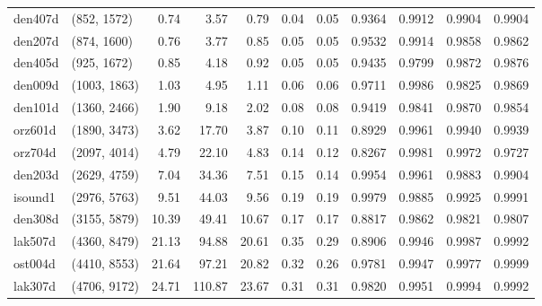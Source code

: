\begin{tabular}{llrrrrrrrrr}
 den407d &  (852, 1572) &  0.74 &   3.57 &  0.79 &  0.04 &   0.05 &   0.9364 &   0.9912 &     0.9904 &      0.9904 \\
 den207d &  (874, 1600) &  0.76 &   3.77 &  0.85 &  0.05 &   0.05 &   0.9532 &   0.9914 &     0.9858 &      0.9862 \\
 den405d &  (925, 1672) &  0.85 &   4.18 &  0.92 &  0.05 &   0.05 &   0.9435 &   0.9799 &     0.9872 &      0.9876 \\
 den009d & (1003, 1863) &  1.03 &   4.95 &  1.11 &  0.06 &   0.06 &   0.9711 &   0.9986 &     0.9825 &      0.9869 \\
 den101d & (1360, 2466) &  1.90 &   9.18 &  2.02 &  0.08 &   0.08 &   0.9419 &   0.9841 &     0.9870 &      0.9854 \\
 orz601d & (1890, 3473) &  3.62 &  17.70 &  3.87 &  0.10 &   0.11 &   0.8929 &   0.9961 &     0.9940 &      0.9939 \\
 orz704d & (2097, 4014) &  4.79 &  22.10 &  4.83 &  0.14 &   0.12 &   0.8267 &   0.9981 &     0.9972 &      0.9727 \\
 den203d & (2629, 4759) &  7.04 &  34.36 &  7.51 &  0.15 &   0.14 &   0.9954 &   0.9961 &     0.9883 &      0.9904 \\
 isound1 & (2976, 5763) &  9.51 &  44.03 &  9.56 &  0.19 &   0.19 &   0.9979 &   0.9885 &     0.9925 &      0.9991 \\
 den308d & (3155, 5879) & 10.39 &  49.41 & 10.67 &  0.17 &   0.17 &   0.8817 &   0.9862 &     0.9821 &      0.9807 \\
 lak507d & (4360, 8479) & 21.13 &  94.88 & 20.61 &  0.35 &   0.29 &   0.8906 &   0.9946 &     0.9987 &      0.9992 \\
 ost004d & (4410, 8553) & 21.64 &  97.21 & 20.82 &  0.32 &   0.26 &   0.9781 &   0.9947 &     0.9977 &      0.9999 \\
 lak307d & (4706, 9172) & 24.71 & 110.87 & 23.67 &  0.31 &   0.31 &   0.9820 &   0.9951 &     0.9994 &      0.9992 \\
\bottomrule
\end{tabular}
